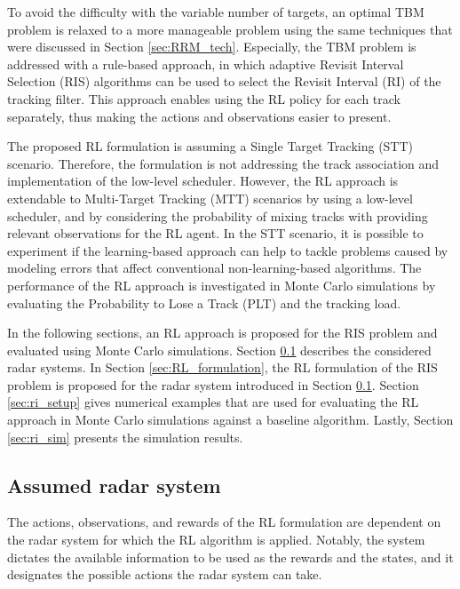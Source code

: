 \documentclass[english, 12pt, a4paper, elec, utf8, a-1b, online]{aaltothesis}
\begin{document}
To avoid the difficulty with the variable number of targets, an optimal TBM problem is relaxed to a more manageable problem using the same techniques that were discussed in Section \ref{sec:RRM_tech}.
Especially, the TBM problem is addressed with a rule-based approach, in which adaptive Revisit Interval Selection (RIS) algorithms can be used to select the Revisit Interval (RI) of the tracking filter.
This approach enables using the RL policy for each track separately, thus making the actions and observations easier to present.

The proposed RL formulation is assuming a Single Target Tracking (STT) scenario. 
Therefore, the formulation is not addressing the track association and implementation of the low-level scheduler.
However, the RL approach is extendable to Multi-Target Tracking (MTT) scenarios by using a low-level scheduler, and by considering the probability of mixing tracks with providing relevant observations for the RL agent.
In the STT scenario, it is possible to experiment if the learning-based approach can help to tackle problems caused by modeling errors that affect conventional non-learning-based algorithms.
The performance of the RL approach is investigated in Monte Carlo simulations by evaluating the Probability to Lose a Track (PLT) and the tracking load.

In the following sections, an RL approach is proposed for the RIS problem and evaluated using Monte Carlo simulations.
Section \ref{sec:system_description} describes the considered radar systems.
In Section \ref{sec:RL_formulation}, the RL formulation of the RIS problem is proposed for the radar system introduced in Section \ref{sec:system_description}.
Section \ref{sec:ri_setup} gives numerical examples that are used for evaluating the RL approach in Monte Carlo simulations against a baseline algorithm. 
Lastly, Section \ref{sec:ri_sim} presents the simulation results.


\subsection{Assumed radar system} \label{sec:system_description}

The actions, observations, and rewards of the RL formulation are dependent on the radar system for which the RL algorithm is applied.
Notably, the system dictates the available information to be used as the rewards and the states, and it designates the possible actions the radar system can take.
 
\end{document}
